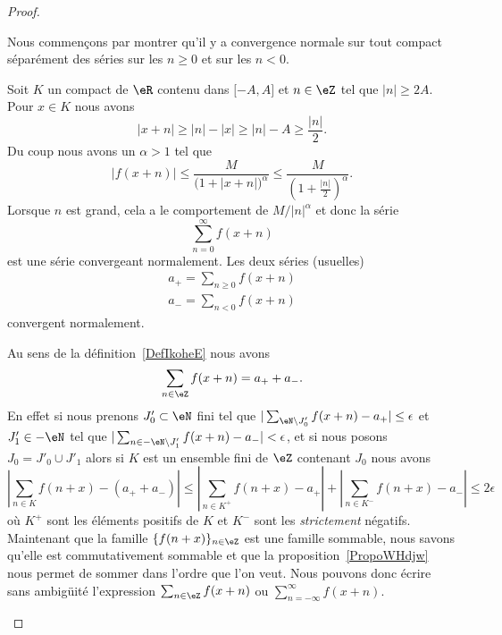\begin{proof}
	\begin{subproof}

		Nous commençons par montrer qu'il y a convergence normale sur tout compact séparément des séries sur les \( n\geq 0\) et sur les \( n<0\).

		Soit \( K\) un compact de \( \eR\) contenu dans \( \mathopen[ -A , A \mathclose]\) et \( n\in \eZ\) tel que \( | n |\geq 2A\). Pour \( x\in K\) nous avons
		\begin{equation}
			| x+n |\geq | n |-| x |\geq | n |-A\geq \frac{ | n | }{ 2 }.
		\end{equation}
		Du coup nous avons un \( \alpha>1\) tel que
		\begin{equation}
			| f(x+n) |\leq \frac{ M }{ \big( 1+| x+n | \big)^{\alpha} }\leq \frac{ M }{ \left( 1+\frac{ | n | }{2} \right)^{\alpha} }.
		\end{equation}
		Lorsque \( n\) est grand, cela a le comportement de \( M/| n |^{\alpha}\) et donc la série
		\begin{equation}
			\sum_{n=0}^{\infty}f(x+n)
		\end{equation}
		est une série convergeant normalement. Les deux séries (usuelles)
		\begin{subequations}
			\begin{align}
				a_+=\sum_{n\geq 0}f(x+n) \\
				a_-=\sum_{n< 0}f(x+n)
			\end{align}
		\end{subequations}
		convergent normalement.

		Au sens de la définition~\ref{DefIkoheE} nous avons
		\begin{equation}
			\sum_{n\in \eZ}f(x+n)=a_++a_-.
		\end{equation}
		En effet si nous prenons \( J'_0\subset\eN\) fini tel que \( |\sum_{\eN\setminus J_0'}f(x+n)-a_+|\leq \epsilon\) et \( J'_1\in -\eN\) tel que \( |\sum_{n\in -\eN\setminus J'_1}f(x+n)-a_-|<\epsilon\), et si nous posons \( J_0=J'_0\cup J'_1\) alors si \( K\) est un ensemble fini de \( \eZ\) contenant \( J_0\) nous avons
		\begin{equation}
			| \sum_{n\in K}f(n+x)-(a_++a_-) |\leq | \sum_{n\in K^+}f(n+x)-a_+ |+| \sum_{n\in K^-}f(n+x)-a_- |\leq 2\epsilon
		\end{equation}
		où \( K^+\) sont les éléments positifs de \(K\) et \( K^-\) sont les \emph{strictement} négatifs. Maintenant que la famille \( \{ f(n+x) \}_{n\in \eZ}\) est une famille sommable, nous savons qu'elle est commutativement sommable et que la proposition~\ref{PropoWHdjw} nous permet de sommer dans l'ordre que l'on veut. Nous pouvons donc écrire sans ambigüité l'expression \( \sum_{n\in \eZ}f(x+n)\) ou \( \sum_{n=-\infty}^{\infty}f(x+n)\).


\end{subproof}
\end{proof}
